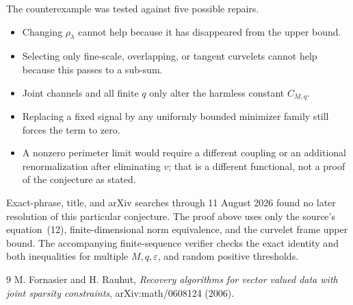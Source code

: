 \documentclass[10pt]{article}
\begin{document}
The counterexample was tested against five possible repairs.
\begin{itemize}
\item Changing $\rho_\lambda$ cannot help because it has disappeared from
the upper bound.
\item Selecting only fine-scale, overlapping, or tangent curvelets cannot
help because this passes to a sub-sum.
\item Joint channels and all finite $q$ only alter the harmless constant
$C_{M,q}$.
\item Replacing a fixed signal by any uniformly bounded minimizer family
still forces the term to zero.
\item A nonzero perimeter limit would require a different coupling or an
additional renormalization after eliminating $v$; that is a different
functional, not a proof of the conjecture as stated.
\end{itemize}

Exact-phrase, title, and arXiv searches through 11 August 2026 found no later
resolution of this particular conjecture.  The proof above uses only the
source's equation~(12), finite-dimensional norm equivalence, and the curvelet
frame upper bound.  The accompanying finite-sequence verifier checks the
exact identity and both inequalities for multiple $M,q,\varepsilon$, and
random positive thresholds.

\begin{thebibliography}{9}
M. Fornasier and H. Rauhut,
\emph{Recovery algorithms for vector valued data with joint sparsity
constraints}, arXiv:math/0608124 (2006).
\end{thebibliography}
\end{document}
